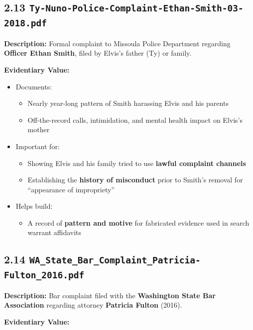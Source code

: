 \documentclass[11pt, letterpaper]{article}
\begin{document}
\subsection{2.13 \texttt{Ty-Nuno-Police-Complaint-Ethan-Smith-03-2018.pdf}}

\textbf{Description:} Formal complaint to Missoula Police Department regarding \textbf{Officer Ethan Smith}, filed by Elvis's father (Ty) or family.

\textbf{Evidentiary Value:}

\begin{itemize}[leftmargin=*]
  \item Documents:
    \begin{itemize}
      \item Nearly year-long pattern of Smith harassing Elvis and his parents
      \item Off-the-record calls, intimidation, and mental health impact on Elvis's mother
    \end{itemize}
  \item Important for:
    \begin{itemize}
      \item Showing Elvis and his family tried to use \textbf{lawful complaint channels}
      \item Establishing the \textbf{history of misconduct} prior to Smith's removal for ``appearance of impropriety''
    \end{itemize}
  \item Helps build:
    \begin{itemize}
      \item A record of \textbf{pattern and motive} for fabricated evidence used in search warrant affidavits
    \end{itemize}
\end{itemize}

\subsection{2.14 \texttt{WA\_State\_Bar\_Complaint\_Patricia-Fulton\_2016.pdf}}

\textbf{Description:} Bar complaint filed with the \textbf{Washington State Bar Association} regarding attorney \textbf{Patricia Fulton} (2016).

\textbf{Evidentiary Value:}
\end{document}
